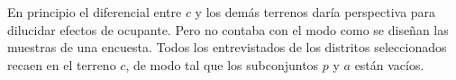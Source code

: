 \documentclass[letter,12pt]{article}
\newcommand{\mc}{\multicolumn}
\begin{document}
En principio el diferencial entre $c$ y los demás terrenos daría perspectiva para dilucidar efectos de ocupante. Pero no contaba con el modo como se diseñan las muestras de una encuesta. Todos los entrevistados de los distritos seleccionados recaen en el terreno $c$, de modo tal que los subconjuntos $p$ y $a$ están vacíos.

\end{document}
